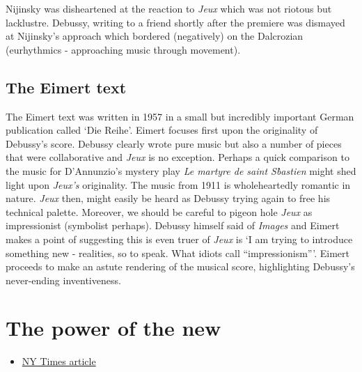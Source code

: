 Nijinsky was disheartened at the reaction to \textit{Jeux} which was not riotous but lacklustre. Debussy, writing to a friend shortly after the premiere was dismayed at Nijinsky's approach which bordered (negatively) on the Dalcrozian (eurhythmics - approaching music through movement). 


\subsection{The Eimert text}
The Eimert text was written in 1957 in a small but incredibly important German publication called `Die Reihe'. Eimert focuses first upon the originality of Debussy's score. Debussy clearly wrote pure music but also a number of pieces that were collaborative and \textit{Jeux} is no exception. Perhaps a quick comparison to the music for D'Annunzio's mystery play \textit{Le martyre de saint S\`bastien} might shed light upon \textit{Jeux's} originality. The music from 1911 is wholeheartedly romantic in nature. \textit{Jeux} then, might easily be heard as Debussy trying again to free his technical palette. Moreover, we should be careful to pigeon hole \textit{Jeux} as impressionist (symbolist perhaps). Debussy himself said of \textit{Images} and Eimert makes a point of suggesting this is even truer of \textit{Jeux} is `I am trying to introduce something new - realities, so to speak. What idiots call ``impressionism'''. Eimert proceeds to make an astute rendering of the musical score, highlighting Debussy's never-ending inventiveness.  

\section{The power of the new}
\begin{itemize}
\item \href{http://www.nytimes.com/2012/09/19/arts/music/radical-music-sometimes-shocking-sometimes-subtle.html?pagewanted=all&_r=0}{NY Times article}
\end{itemize}

